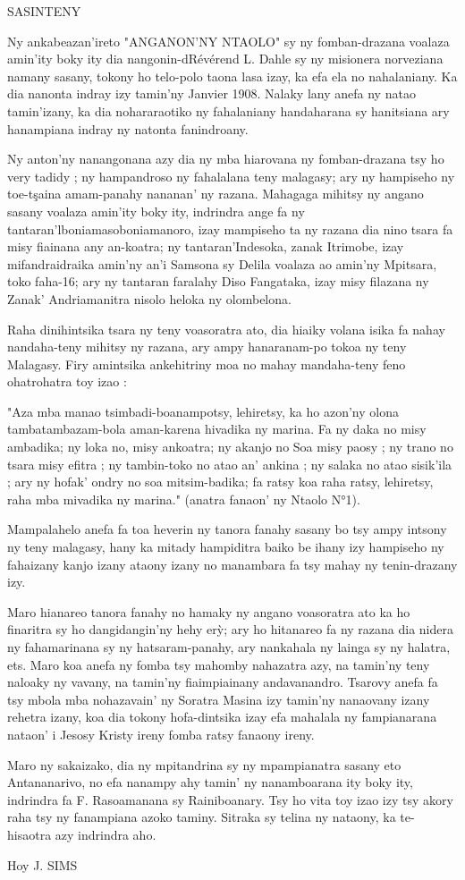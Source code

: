 
SASINTENY

Ny ankabeazan'ireto "ANGANON'NY NTAOLO" sy ny fomban-drazana voalaza amin'ity boky ity dia nangonin-dRévérend 
L. Dahle sy ny misionera norveziana namany sasany, tokony ho telo-polo taona lasa izay,
ka efa ela no nahalaniany. 
Ka dia nanonta indray izy tamin'ny Janvier 1908. Nalaky lany anefa ny natao tamin'izany, 
ka dia nohararaotiko ny fahalaniany handaharana sy hanitsiana ary hanampiana indray ny natonta fanindroany.

Ny anton'ny nanangonana azy dia ny mba hiarovana ny fomban-drazana tsy ho very tadidy ; 
ny hampandroso ny fahalalana teny malagasy; ary ny hampiseho ny toe-tşaina amam-panahy nananan' ny razana.
Mahagaga mihitsy ny angano sasany voalaza amin'ity boky ity, 
indrindra ange fa ny tantaran'lboniamasoboniamanoro, izay mampiseho
ta ny razana dia nino tsara fa misy fiainana any an-koatra; ny tantaran'Indesoka, 
zanak Itrimobe, izay mifandraidraika amin'ny an'i Samsona sy
Delila voalaza ao amin'ny Mpitsara, toko faha-16; ary ny tantaran faralahy Diso Fangataka, 
izay misy filazana ny Zanak' Andriamanitra nisolo heloka ny olombelona.

Raha dinihintsika tsara ny teny voasoratra ato, dia hiaiky volana isika fa nahay 
nandaha-teny mihitsy ny razana, ary ampy hanaranam-po tokoa ny teny Malagasy. 
Firy amintsika ankehitriny moa no mahay mandaha-teny feno ohatrohatra toy izao :

"Aza mba manao tsimbadi-boanampotsy, lehiretsy, ka ho azon'ny olona tambatambazam-bola 
aman-karena hivadika ny marina. Fa ny daka no misy ambadika; 
ny loka no, misy ankoatra; ny akanjo no Soa misy paosy ; ny trano no tsara misy efitra ; 
ny tambin-toko no atao an' ankina ; ny salaka no atao sisik'ila ; 
ary ny hofak' ondry no soa mitsim-badika; fa ratsy koa raha ratsy, lehiretsy, raha mba mivadika ny marina." 
(anatra fanaon' ny Ntaolo N°1).

Mampalahelo anefa fa toa heverin ny tanora fanahy sasany bo tsy ampy intsony ny teny malagasy, 
hany ka mitady hampiditra baiko be ihany izy hampiseho ny fahaizany kanjo izany ataony izany no manambara fa
tsy mahay ny tenin-drazany izy.

Maro hianareo tanora fanahy no hamaky ny angano voasoratra ato ka ho finaritra sy ho dangidangin'ny hehy erỳ; 
ary ho hitanareo fa ny razana dia nidera ny fahamarinana sy ny hatsaram-panahy, ary nankahala ny
lainga sy ny halatra, ets. Maro koa anefa ny fomba tsy mahomby nahazatra azy, na tamin'ny teny naloaky ny vavany,
na tamin'ny fiaimpiainany andavanandro. Tsarovy anefa fa tsy mbola mba nohazavain' ny Soratra
Masina izy tamin'ny nanaovany izany rehetra izany, koa dia tokony hofa-dintsika izay efa mahalala 
ny fampianarana nataon' i Jesosy Kristy ireny
fomba ratsy fanaony ireny.

Maro ny sakaizako, dia ny mpitandrina sy ny mpampianatra sasany eto Antananarivo, 
no efa nanampy ahy tamin' ny nanamboarana ity boky ity, indrindra fa F. Rasoamanana sy Rainiboanary. 
Tsy ho vita toy izao izy tsy akory raha tsy ny fanampiana azoko taminy. Sitraka sy telina ny nataony, 
ka te-hisaotra azy indrindra aho.

Hoy J. SIMS